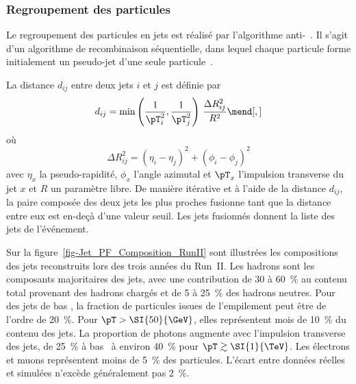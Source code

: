 \subsubsection{Regroupement des particules}\label{chapter-CMS-section-jets_reco-subsec-algo}
Le regroupement des particules en jets est réalisé par l'algorithme anti-\kT~\cite{Cacciari_antikT}.
Il s'agit d'un algorithme de recombinaison séquentielle,
dans lequel chaque particule forme initialement un pseudo-jet d'une seule particule~\cite{Cacciari:2011ma}.
\par
La distance $d_{ij}$ entre deux jets $i$ et $j$ est définie par
\begin{equation}
d_{ij} = \min\left(\frac{1}{{\pT}_i^2}, \frac{1}{{\pT}_j^2}\right) \, \frac{\Delta R_{ij}^2}{R^2}
\mend[,]
\end{equation}
où
\begin{equation}
\Delta R_{ij}^2 = (\eta_i-\eta_j)^2 + (\phi_i-\phi_j)^2
\end{equation}
avec $\eta_x$ la pseudo-rapidité,
$\phi_x$ l'angle azimutal et
${\pT}_x$ l'impulsion transverse du jet $x$ et
$R$ un paramètre libre.
De manière itérative et à l'aide de la distance $d_{ij}$, la paire composée des deux jets les plus proches fusionne tant que la distance entre eux est en-deçà d'une valeur seuil.
Les jets fusionnés donnent la liste des jets de l'événement.
\par
Sur la figure~\ref{fig-Jet_PF_Composition_RunII} sont illustrées les compositions des jets reconstruits lors des trois années du Run~II.
Les hadrons sont les composants majoritaires des jets,
avec une contribution de
\num{30} à \SI{60}{\%}
au contenu total
provenant des hadrons chargés
et de
\num{5} à \SI{25}{\%}
des hadrons neutres.
Pour des jets de bas \pT,
la fraction de particules issues de l'empilement peut être de l'ordre de \SI{20}{\%}.
Pour $\pT>\SI{50}{\GeV}$, elles représentent mois de \SI{10}{\%} du contenu des jets.
La proportion de photons augmente avec l'impulsion transverse des jets,
de \SI{25}{\%} à bas \pT\
à
environ \SI{40}{\%} pour $\pT\gtrsim\SI{1}{\TeV}$.
Les électrons et muons représentent moins de \SI{5}{\%} des particules.
L'écart entre données réelles et simulées n'excède généralement pas \SI{2}{\%}.
